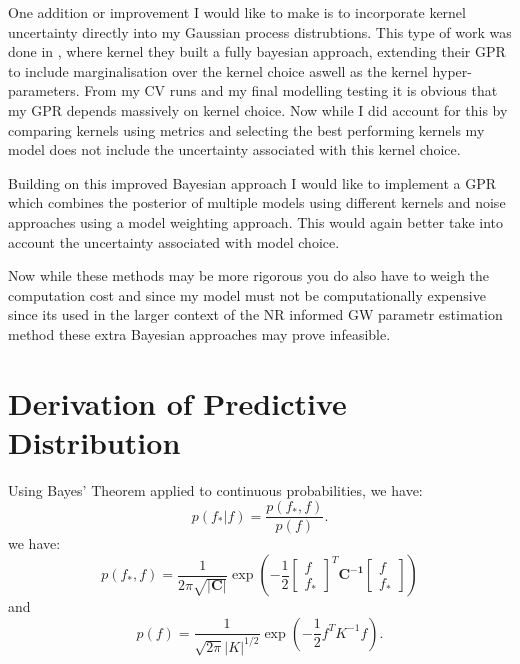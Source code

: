 \documentclass{ucdgradtaughtthesis}
\begin{document}
One addition or improvement I would like to make is to incorporate kernel uncertainty directly into my Gaussian process distrubtions. This type of work was done in \cite{kernelposterior}, where kernel they built a fully bayesian approach,
extending their GPR to include marginalisation over the kernel choice aswell as the kernel hyper-parameters. From my CV runs and my final modelling testing it is obvious that my GPR depends massively on kernel choice. Now while I did account for this by comparing kernels using metrics
and selecting the best performing kernels my model does not include the uncertainty associated with this kernel choice. 

Building on this improved Bayesian approach I would like to implement a GPR which combines the posterior of multiple models using different kernels and noise approaches using a model weighting approach. This would 
again better take into account the uncertainty associated with model choice.

Now while these methods may be more rigorous you do also have to weigh the computation cost and since my model must not be computationally expensive since its used in the larger context of the NR informed GW parametr estimation method these
extra Bayesian approaches may prove infeasible.


\newpage
 


\newpage
\appendix
\section{Derivation of Predictive Distribution}
\label{appendix:A}
Using Bayes' Theorem applied to continuous probabilities, we have:
\[
p(f_* | f) = \frac{p(f_*, f)}{p(f)}.
\]
we have:
$$p(f_*,f) = \frac{1}{2\pi\sqrt{\mathbf{|C|}}}\exp \left(-\frac{1}{2} 
\begin{bmatrix} f \\ f_*  \end{bmatrix}^T\mathbf{C^{-1}}\begin{bmatrix} f  \\ f_* \end{bmatrix}\right)$$
and 
\[
p(f) = \frac{1}{\sqrt{2\pi} |K|^{1/2}}
\exp \left(-\frac{1}{2} f^T K^{-1} f \right).
\]
\end{document}
